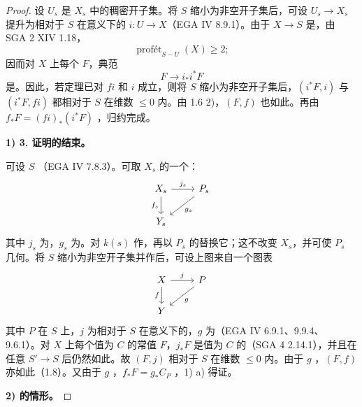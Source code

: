\begin{proof}
设 $U_s$ 是 $X_s$ 中的稠密开子集。将 $S$ 缩小为非空开子集后，可设 $U_s\to X_s$ 提升为相对于 $S$ 在意义下的 $i:U\to X$（EGA IV 8.9.1）。由于 $X\to S$ 是，由 SGA 2 XIV 1.18，
\[
\operatorname{prof\text{ét}}_{S-U}(X)\geq2;
\]
因而对 $X$ 上每个 $F$，典范
\[F\longrightarrow i_*i^*F\]
是。因此，若定理已对 $fi$ 和 $i$ 成立，则将 $S$ 缩小为非空开子集后，$(i^*F,i)$ 与 $(i^*F,fi)$ 都相对于 $S$ 在维数 $\leq0$ 内。由 1.6 2)，$(F,f)$ 也如此。再由 $f_*F=(fi)_*(i^*F)$ ，归约完成。

\textbf{1) 3. 证明的结束。}

可设 $S$ （EGA IV 7.8.3）。可取 $X_s$ 的一个：
\[
\begin{tikzcd}
X_s\arrow[r,"j_s"]\arrow[d,"f_s"']&P_s\arrow[dl,"g_s"]\\
Y_s&
\end{tikzcd}
\]
其中 $j_s$ 为，$g_s$ 为。对 $k(s)$ 作，再以 $P_s$ 的替换它；这不改变 $X_s$，并可使 $P_s$ 几何。将 $S$ 缩小为非空开子集并作后，可设上图来自一个图表
\[
\begin{tikzcd}
X\arrow[r,"j"]\arrow[d,"f"']&P\arrow[dl,"g"]\\
Y&
\end{tikzcd}
\]
其中 $P$ 在 $S$ 上，$j$ 为相对于 $S$ 在意义下的，$g$ 为（EGA IV 6.9.1、9.9.4、9.6.1）。对 $X$ 上每个值为 $C$ 的常值 $F$，$j_*F$ 是值为 $C$ 的（SGA 4 2.14.1），并且在任意 $S'\to S$ 后仍然如此。故 $(F,j)$ 相对于 $S$ 在维数 $\leq0$ 内。由于 $g$ ，$(F,f)$ 亦如此（1.8）。又由于 $g$ ，$f_*F=g_*C_P$ ，1) a) 得证。

\textbf{2) 的情形。}


\end{proof}
